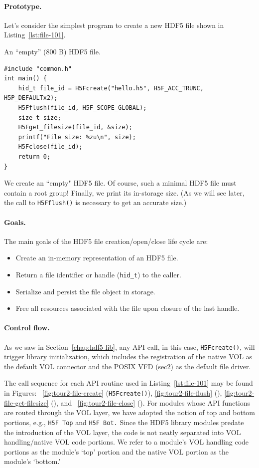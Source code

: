\paragraph{Prototype.} Let's consider the simplest program to create a new HDF5 file shown in Listing~\ref{lst:file-101}.

\begin{listing}
\centering
\caption{An ``empty'' (800 B) HDF5 file.}
\label{lst:file-101}
\begin{verbatim}
#include "common.h"
int main() {
    hid_t file_id = H5Fcreate("hello.h5", H5F_ACC_TRUNC, H5P_DEFAULTx2);
    H5Fflush(file_id, H5F_SCOPE_GLOBAL);
    size_t size;
    H5Fget_filesize(file_id, &size);
    printf("File size: %zu\n", size);
    H5Fclose(file_id);
    return 0;
}
\end{verbatim}
\end{listing}

We create an ``empty" HDF5 file. Of course, such a minimal HDF5 file must contain a root group! Finally, we print its in-storage size. (As we will see later, the call to \texttt{H5Fflush()} is necessary to get an accurate size.)

\paragraph{Goals.} The main goals of the HDF5 file creation/open/close life cycle are:
\begin{itemize}
    \item Create an in-memory representation of an HDF5 file.
    \item Return a file identifier or handle (\texttt{hid\_t}) to the caller.
    \item Serialize and persist the file object in storage.
    \item Free all resources associated with the file upon closure of the last handle.
\end{itemize}

\paragraph{Control flow.} As we saw in Section~\ref{chap:hdf5-lib}, any API call, in this case, \texttt{H5Fcreate()}, will trigger library initialization, which includes the registration of the native VOL as the default VOL connector and the POSIX VFD (sec2) as the default file driver. 

The call sequence for each API routine used in Listing~\ref{lst:file-101} may be found in Figures: ~\ref{fig:tour2-file-create} (\texttt{H5Fcreate()}), \ref{fig:tour2-file-flush} (), \ref{fig:tour2-file-get-filesize} (), and ~\ref{fig:tour2-file-close} (). For modules whose API functions are routed through the VOL layer, we have adopted the notion of top and bottom portions, e.g., \texttt{H5F Top} and \texttt{H5F Bot.} Since the HDF5 library modules predate the introduction of the VOL layer, the code is not neatly separated into VOL handling/native VOL code portions. We refer to a module's VOL handling code portions as the module's `top' portion and the native VOL portion as the module's `bottom.'

